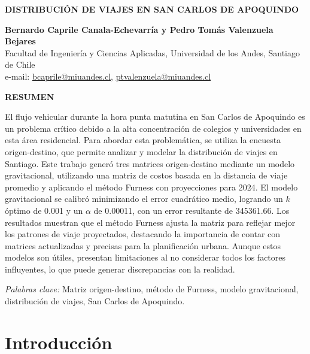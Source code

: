 \documentclass[letterpaper,12pt]{article}
\begin{document}
\begin{titlepage}
    \begin{center}
      \vspace*{1cm}

    \textbf{\Large DISTRIBUCIÓN DE VIAJES EN SAN CARLOS DE APOQUINDO}

    \vspace{1cm}

    \textbf{Bernardo Caprile Canala-Echevarría y Pedro Tomás Valenzuela Bejares}\\
    Facultad de Ingeniería y Ciencias Aplicadas, Universidad de los Andes, Santiago de Chile\\
    e-mail: \href{mailto:bcaprile@miuandes.cl}{bcaprile@miuandes.cl}, \href{mailto: ptvalenzuela@miuandes.cl}{ptvalenzuela@miuandes.cl}

    \vspace{2cm}

    \textbf{RESUMEN}


    \end{center}
    El flujo vehicular durante la hora punta matutina en San Carlos de Apoquindo es un problema crítico debido a la alta concentración de colegios y universidades en esta área residencial. Para abordar esta problemática, se utiliza la encuesta origen-destino, que permite analizar y modelar la distribución de viajes en Santiago. Este trabajo generó tres matrices origen-destino mediante un modelo gravitacional, utilizando una matriz de costos basada en la distancia de viaje promedio y aplicando el método Furness con proyecciones para 2024. El modelo gravitacional se calibró minimizando el error cuadrático medio, logrando un \( k \) óptimo de 0.001 y un \( \alpha \) de 0.00011, con un error resultante de 345361.66. Los resultados muestran que el método Furness ajusta la matriz para reflejar mejor los patrones de viaje proyectados, destacando la importancia de contar con matrices actualizadas y precisas para la planificación urbana. Aunque estos modelos son útiles, presentan limitaciones al no considerar todos los factores influyentes, lo que puede generar discrepancias con la realidad.

    \vspace{0.5cm} 
    \textit{Palabras clave:} Matriz origen-destino, método de Furness, modelo gravitacional, distribución de viajes, San Carlos de Apoquindo.
\end{titlepage}

\newpage

\section{Introducción}
\end{document}
